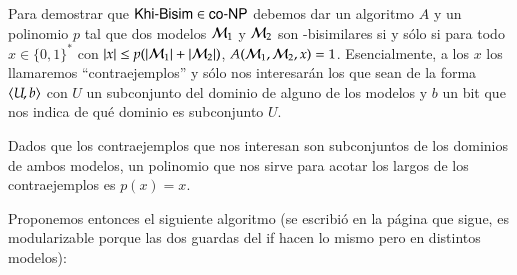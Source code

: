 \begin{demostracion}
    Para demostrar que $\rm\textsf{Khi-Bisim} \in \rm\textsf{co-NP}$ debemos dar un algoritmo $A$ y un polinomio $p$ tal que dos modelos 
    $\mathcal{M}_1$ y $\mathcal{M}_2$ son \KHilogic-bisimilares si y sólo si para todo $x \in \{0,1\}^*$ con 
    $|x| \le p(|\mathcal{M}_1|+|\mathcal{M}_2|)$,  $A(\mathcal{M}_1,\mathcal{M}_2,x) = 1$. Esencialmente, a los $x$ los 
    llamaremos ``contraejemplos'' y sólo nos interesarán los que sean de la forma $\langle U,b \rangle$ con $U$ un 
    subconjunto del dominio de alguno de los modelos y $b$ un bit que nos indica de qué dominio es subconjunto $U$. 

    Dados que los contraejemplos que nos interesan son subconjuntos de los dominios de ambos modelos, un polinomio 
    que nos sirve para acotar los largos de los contraejemplos es $p(x) = x$. 

    Proponemos entonces el siguiente algoritmo (se escribió en la página que sigue, es modularizable porque las dos 
    guardas del if hacen lo mismo pero en distintos modelos):


\end{demostracion}
